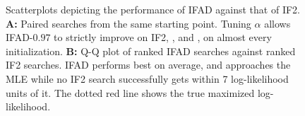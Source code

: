 \documentclass[numsec,webpdf,modern,medium,namedate]{oup-authoring-template}
\newcommand\arxiv[2]{#2} %
\theoremstyle{thmstyleone}%
\theoremstyle{thmstyletwo}%
\theoremstyle{thmstylethree}%
\begin{document}
\begin{figure}[htbp!]
    \caption{Scatterplots depicting the performance of IFAD against that of IF2. \textbf{A:} Paired searches from the same starting point. Tuning $\alpha$ allows IFAD-$0.97$ to strictly improve on IF2, \cite{poyiadjis11}, and \cite{naesseth18}, on almost every initialization. \textbf{B:} Q-Q plot of ranked IFAD searches against ranked IF2 searches. IFAD performs best on average, and approaches the MLE while no IF2 search successfully gets within 7 log-likelihood units of it. The dotted red line shows the true maximized log-likelihood. }
    \label{fig:scatter}
    \arxiv{}{\vspace*{-4mm}}
\end{figure}


  
\end{document}
